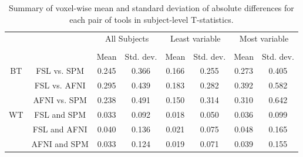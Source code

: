\documentclass[conference]{IEEEtran}
\begin{document}
\setlength{\tabcolsep}{5pt}
\begin{table}[h]
    \centering
    \begin{tabular}{cccc|cc|cc}
        \toprule
        \multirow{2}{*}{} &{} & \multicolumn{2}{c}{All Subjects} & \multicolumn{2}{c}{Least variable} & \multicolumn{2}{c}{Most variable} \\
        \cmidrule{3-4} \cmidrule{5-6} \cmidrule{7-8} \\
        {} & {} & Mean  & Std. dev.  & Mean & Std. dev. & Mean  & Std. dev. \\
        \midrule
        \rowcolor{lightgray}
        {BT} & FSL vs. SPM           & 0.245     & 0.366       & 0.166     & 0.255    & 0.273    & 0.405  \\
        \rowcolor{lightgray}
        {}   & FSL vs. AFNI          & 0.295     & 0.439      & 0.183     & 0.282     & 0.392    & 0.582  \\
        \rowcolor{lightgray}
        {}   & AFNI vs. SPM          & 0.238     & 0.491      & 0.150     & 0.314     & 0.310    & 0.642  \\
        {WT} & FSL and SPM    & 0.033     & 0.092      & 0.018     & 0.050     & 0.036    & 0.099  \\
        {}   & FSL and AFNI   & 0.040     & 0.136      & 0.021     & 0.075     & 0.048    & 0.165  \\
        {}   & AFNI and SPM   & 0.033     & 0.124      & 0.019     & 0.071     & 0.039    & 0.155  \\
        \bottomrule
    \end{tabular}
    \caption{Summary of voxel-wise mean and standard deviation of absolute differences for each pair of tools
    in subject-level T-statistics.}
    \label{table:firstlevel-stats}
\end{table}


\end{document}
